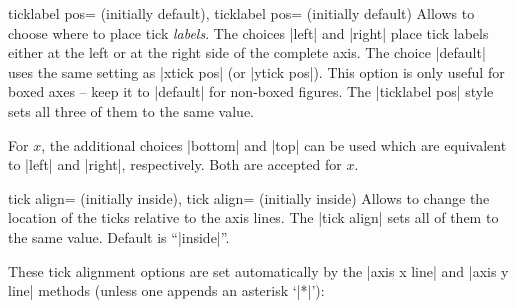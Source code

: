 \begin{pgfplotsxykeylist}{%
	\x ticklabel pos= (initially default),
	   ticklabel pos= (initially default)}
Allows to choose where to place tick \emph{labels}. The choices |left| and |right| place tick labels either at the left or at the right side of the complete axis. The choice |default| uses the same setting as |xtick pos| (or |ytick pos|). This option is only useful for boxed axes -- keep it to |default| for non-boxed figures. The |ticklabel pos| style sets all three of them to the same value.

For $x$, the additional choices |bottom| and |top| can be used which are equivalent to |left| and |right|, respectively. Both are accepted for $x$.
\end{pgfplotsxykeylist}

\begin{pgfplotsxykeylist}{%
	\x tick align= (initially inside),
	   tick align= (initially inside)}
Allows to change the location of the ticks relative to the axis lines. The |tick align| sets all of them to the same value.
Default is ``|inside|''.
\begin{codeexample}[]
\end{codeexample}

\begin{codeexample}[]
\end{codeexample}

These tick alignment options are set automatically by the |axis x line| and |axis y line| methods (unless one appends an asterisk `|*|'):
\begin{codeexample}[]
\end{codeexample}

\end{pgfplotsxykeylist}

